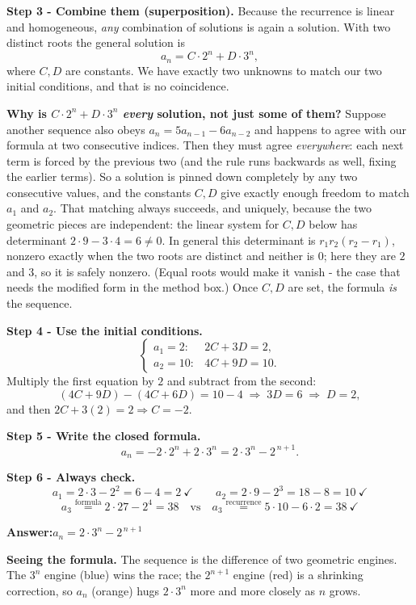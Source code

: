 \documentclass[11pt,a4paper]{article}
\newcommand{\answer}[1]{\begin{answerbox}\centering\textbf{Answer:}\quad #1\end{answerbox}}
\begin{document}
\textbf{Step 3 - Combine them (superposition).}
Because the recurrence is linear and homogeneous, \emph{any} combination of solutions is
again a solution. With two distinct roots the general solution is
\[
a_n = C\cdot 2^n + D\cdot 3^n,
\]
where $C,D$ are constants. We have exactly two unknowns to match our two initial
conditions, and that is no coincidence.

\textbf{Why is $C\cdot2^n+D\cdot3^n$ \emph{every} solution, not just some of them?} Suppose another
sequence also obeys $a_n=5a_{n-1}-6a_{n-2}$ and happens to agree with our formula at two
consecutive indices. Then they must agree \emph{everywhere}: each next term is forced by the
previous two (and the rule runs backwards as well, fixing the earlier terms). So a solution is
pinned down completely by any two consecutive values, and the constants $C,D$ give exactly
enough freedom to match $a_1$ and $a_2$. That matching always succeeds, and uniquely, because the
two geometric pieces are independent: the linear system for $C,D$ below has determinant
$2\cdot 9-3\cdot 4=6\neq 0$. In general this determinant is $r_1 r_2(r_2-r_1)$, nonzero exactly when
the two roots are distinct and neither is $0$; here they are $2$ and $3$, so it is safely nonzero.
(Equal roots would make it vanish - the case that needs the modified form in the method box.) Once
$C,D$ are set, the formula \emph{is} the sequence.

\textbf{Step 4 - Use the initial conditions.}
\[
\begin{cases}
a_1=2: & 2C+3D=2,\\[2pt]
a_2=10: & 4C+9D=10.
\end{cases}
\]
Multiply the first equation by $2$ and subtract from the second:
\[
(4C+9D)-(4C+6D)=10-4 \;\Longrightarrow\; 3D=6 \;\Longrightarrow\; D=2,
\]
and then $2C+3(2)=2\Rightarrow C=-2$.

\textbf{Step 5 - Write the closed formula.}
\[
a_n=-2\cdot 2^n+2\cdot 3^n = 2\cdot 3^n - 2^{\,n+1}.
\]

\textbf{Step 6 - Always check.}
\[
a_1=2\cdot3-2^2=6-4=2\ \checkmark\qquad
a_2=2\cdot9-2^3=18-8=10\ \checkmark
\]
\[
a_3 \stackrel{\text{formula}}{=} 2\cdot27-2^4=38
\quad\text{vs}\quad
a_3 \stackrel{\text{recurrence}}{=} 5\cdot10-6\cdot2=38\ \checkmark
\]

\answer{$\displaystyle a_n = 2\cdot 3^n - 2^{\,n+1}$}

\medskip
\textbf{Seeing the formula.}
The sequence is the difference of two geometric \textquotedbl{}engines\textquotedbl{}. The $3^n$ engine (blue) wins
the race; the $2^{n+1}$ engine (red) is a shrinking correction, so $a_n$ (orange) hugs
$2\cdot3^n$ more and more closely as $n$ grows.
\end{document}
